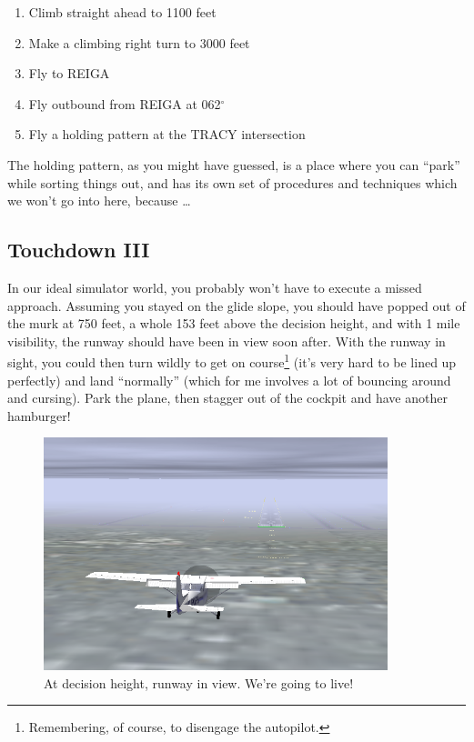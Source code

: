 \begin{enumerate}
\item Climb straight ahead to 1100 feet
\item Make a climbing right turn to 3000 feet
\item Fly to REIGA
\item Fly outbound from REIGA at 062$^\circ$
\item Fly a holding pattern at the TRACY intersection
\end{enumerate}


The holding pattern, as you might have guessed, is a place where you
can ``park'' while sorting things out, and has its own set of
procedures and techniques which we won't go into here, because
\ldots{}
\subsection{Touchdown III}

In our ideal simulator world, you probably won't have to execute a
missed approach.  Assuming you stayed on the glide slope, you should
have popped out of the murk at 750 feet, a whole 153 feet above the
decision height, and with 1 mile visibility, the runway should have
been in view soon after.  With the runway in sight, you could then
turn wildly to get on course\footnote{Remembering, of course, to
  disengage the autopilot.}  (it's very hard to be lined up perfectly)
and land ``normally'' (which for me involves a lot of bouncing around
and cursing).  Park the plane, then stagger out of the cockpit and
have another hamburger!

\begin{figure}
  \begin{center}
    \includegraphics[width=10cm]{img/DH_plane_clipped}
    \caption{At decision height, runway in view.  We're going to live!}
    \label{fig:DH_plane_clipped}
  \end{center}
\end{figure}

